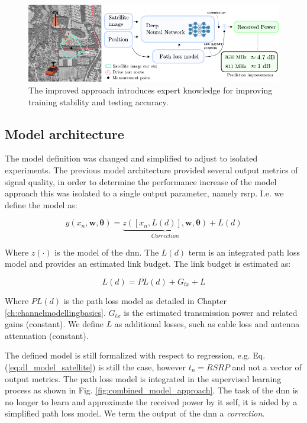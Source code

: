 \begin{figure}
    \centering
    \includegraphics{chapters/part_pathloss/model_aided_paper/version2_approach_figure.pdf}
    \caption{The improved approach introduces expert knowledge for improving training stability and testing accuracy.}
    \label{fig:my_label}
\end{figure}

\subsection{Model architecture}
The model definition was changed and simplified to adjust to isolated experiments. The previous model architecture provided several output metrics of signal quality, in order to determine the performance increase of the model approach this was isolated to a single output parameter, namely \gls{rsrp}. I.e. we define the model as:

\begin{equation}\label{eq:model}
    y(x_n, \mathbf{w}, \bm{\theta}) = \underbrace{z([x_n, L(d)], \mathbf{w}, \bm{\theta})}_{Correction} + L(d)
\end{equation}

Where $z(\cdot)$ is the model of the \gls{dnn}. The $L(d)$ term is an integrated path loss model and provides an estimated link budget. The link budget is estimated as:

\begin{equation}\label{eq:path_loss_model_linkbudget}
L(d) = PL(d) + G_{tx} + L
\end{equation}

Where $PL(d)$ is the  path loss model as detailed in Chapter \ref{ch:channelmodellingbasics}. $G_{tx}$ is the estimated transmission power and related gains (constant). We define $L$ as additional losses, such as cable loss and antenna attenuation (constant). 

The defined model is still formalized with respect to regression, e.g. Eq. (\ref{eq:dl_model_satellite}) is still the case, however $t_n = RSRP$ and not a vector of output metrics. The path loss model is integrated in the supervised learning process as shown in Fig. \ref{fig:combined_model_approach}. The task of the \gls{dnn} is no longer to learn and approximate the received power by it self, it is aided by a simplified path loss model. We term the output of the \gls{dnn} a \emph{correction}.


